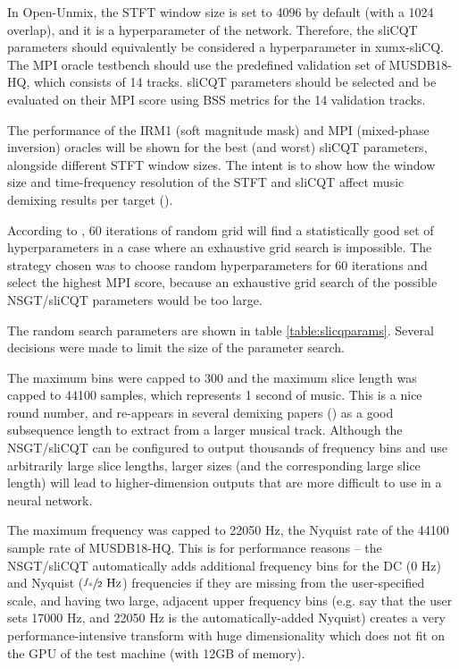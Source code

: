 \documentclass[report.tex]{subfiles}
\begin{document}
In Open-Unmix, the STFT window size is set to 4096 by default (with a 1024 overlap), and it is a hyperparameter of the network. Therefore, the sliCQT parameters should equivalently be considered a hyperparameter in xumx-sliCQ. The MPI oracle testbench should use the predefined validation set of MUSDB18-HQ, which consists of 14 tracks. sliCQT parameters should be selected and be evaluated on their MPI score using BSS metrics for the 14 validation tracks.

The performance of the IRM1 (soft magnitude mask) and MPI (mixed-phase inversion) oracles will be shown for the best (and worst) sliCQT parameters, alongside different STFT window sizes. The intent is to show how the window size and time-frequency resolution of the STFT and sliCQT affect music demixing results per target (\cite{tftradeoff1}).

According to \textcite{randomgrid}, 60 iterations of random grid will find a statistically good set of hyperparameters in a case where an exhaustive grid search is impossible. The strategy chosen was to choose random hyperparameters for 60 iterations and select the highest MPI score, because an exhaustive grid search of the possible NSGT/sliCQT parameters would be too large. 

The random search parameters are shown in table \ref{table:slicqparams}. Several decisions were made to limit the size of the parameter search.

The maximum bins were capped to 300 and the maximum slice length was capped to 44100 samples, which represents 1 second of music. This is a nice round number, and re-appears in several demixing papers (\cite{plumbley1, plumbley2, demucs}) as a good subsequence length to extract from a larger musical track. Although the NSGT/sliCQT can be configured to output thousands of frequency bins and use arbitrarily large slice lengths, larger sizes (and the corresponding large slice length) will lead to higher-dimension outputs that are more difficult to use in a neural network.

The maximum frequency was capped to 22050 Hz, the Nyquist rate of the 44100 sample rate of MUSDB18-HQ. This is for performance reasons -- the NSGT/sliCQT automatically adds additional frequency bins for the DC (0 Hz) and Nyquist ($\sfrac{f_{s}}{2} \text{ Hz}$) frequencies if they are missing from the user-specified scale, and having two large, adjacent upper frequency bins (e.g. say that the user sets 17000 Hz, and 22050 Hz is the automatically-added Nyquist) creates a very performance-intensive transform with huge dimensionality which does not fit on the GPU of the test machine (with 12GB of memory).
\end{document}
